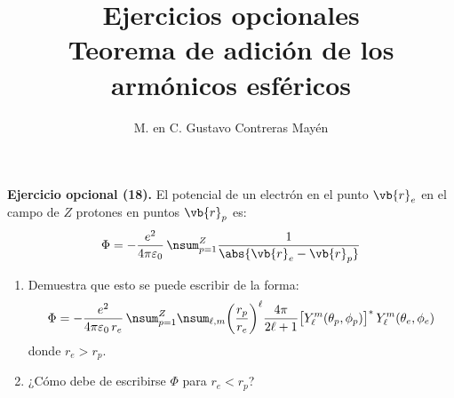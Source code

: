 
\title{Ejercicios opcionales \\[0.3em]  \large{Teorema de adición de los armónicos esféricos} \vspace{-3ex}}
\author{M. en C. Gustavo Contreras Mayén}
\date{ }


\vspace{-4cm}
\maketitle
\fontsize{14}{14}\selectfont


\noindent
\textbf{Ejercicio opcional (18).} El potencial de un electrón en el punto $\vb{r}_{e}$ en el campo de $Z$ protones en puntos $\vb{r}_{p}$ es:
\begin{align*}
\Phi = - \dfrac{e^{2}}{4 \pi \varepsilon_{0}} \, \nsum_{p=1}^{Z} \dfrac{1}{\abs{\vb{r}_{e} - \vb{r}_{p}}}
\end{align*}
\begin{enumerate}[label=\roman*)]
\item Demuestra que esto se puede escribir de la forma:
\begin{align*}
\Phi = - \dfrac{e^{2}}{4 \pi \varepsilon_{0} \, r_{e}} \, \nsum_{p=1}^{Z} \nsum_{\ell, m} \bigg( \dfrac{r_{p}}{r_{e}} \bigg)^{\ell} \dfrac{4 \pi}{2 \ell + 1} \big[ Y_{\ell}^{m} (\theta_{p}, \phi_{p}) \big]^{*} \, Y_{\ell}^{m} (\theta_{e}, \phi_{e})
\end{align*}
donde $r_{e} > r_{p}$.
\item ¿Cómo debe de escribirse $\Phi$ para $r_{e} < r_{p}$?
\end{enumerate}
